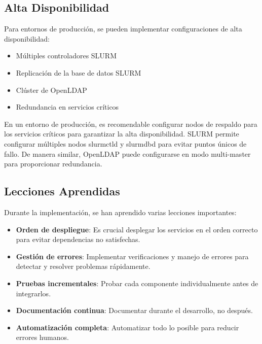 \documentclass[12pt,a4paper]{article}
\begin{document}
\subsection{Alta Disponibilidad}

Para entornos de producción, se pueden implementar configuraciones de alta disponibilidad:

\begin{itemize}[leftmargin=*]
    \item Múltiples controladores SLURM
    \item Replicación de la base de datos SLURM
    \item Clúster de OpenLDAP
    \item Redundancia en servicios críticos
\end{itemize}

\begin{warningbox}
En un entorno de producción, es recomendable configurar nodos de respaldo para los servicios críticos para garantizar la alta disponibilidad. SLURM permite configurar múltiples nodos slurmctld y slurmdbd para evitar puntos únicos de fallo. De manera similar, OpenLDAP puede configurarse en modo multi-master para proporcionar redundancia.
\end{warningbox}

\subsection{Lecciones Aprendidas}

Durante la implementación, se han aprendido varias lecciones importantes:

\begin{itemize}[leftmargin=*]
    \item \textbf{Orden de despliegue}: Es crucial desplegar los servicios en el orden correcto para evitar dependencias no satisfechas.
    \item \textbf{Gestión de errores}: Implementar verificaciones y manejo de errores para detectar y resolver problemas rápidamente.
    \item \textbf{Pruebas incrementales}: Probar cada componente individualmente antes de integrarlos.
    \item \textbf{Documentación continua}: Documentar durante el desarrollo, no después.
    \item \textbf{Automatización completa}: Automatizar todo lo posible para reducir errores humanos.
\end{itemize}
\end{document}
